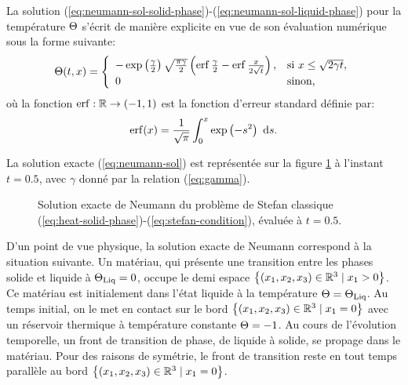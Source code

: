 La solution
(\ref{eq:neumann-sol-solid-phase})-(\ref{eq:neumann-sol-liquid-phase})
pour la température $\Theta$ s'écrit de manière explicite
en vue de son évaluation numérique sous la forme suivante:
\begin{equation}\label{eq:neumann-sol}
  \temperature(t, x) = \left\{
  \begin{array}{ll}
    -\exp\parent{\frac{\gamma}{2}}\sqrt{\frac{\pi\gamma}{2}} %
    \parent{\erf{\frac{\gamma}{2}} - \erf{\frac{x}{2\sqrt{t}}}}, %
    & \text{si } x \leq \sqrt{2\gamma t},\\
    0 %
    & \text{sinon,}
  \end{array}
  \right.
\end{equation}
où la fonction $\operatorname{erf}:\mathbb R\to(-1,1)$ est la fonction d'erreur
standard définie par:
\begin{equation}
  \operatorname{erf}(x) = \frac{1}{\sqrt \pi}\int_0^x \exp\left( -s^2 \right)\,\,\mathrm ds.
\end{equation}

La solution exacte (\ref{eq:neumann-sol}) est représentée sur la
figure \ref{fig:neumann-sol} à l'instant $t = 0.5$, avec $\gamma$
donné par la relation (\ref{eq:gamma}).

\begin{figure}
  \begin{center}
    
    \caption{Solution exacte de Neumann du problème de Stefan classique
      (\ref{eq:heat-solid-phase})-(\ref{eq:stefan-condition}), évaluée
      à $t = 0.5$.}
    \label{fig:neumann-sol}
  \end{center}
\end{figure}

D'un point de vue physique, la solution exacte de Neumann correspond à
la situation suivante. Un matériau, qui présente une transition entre
les phases solide et liquide à $\Theta_\text{Liq} = 0$, occupe le demi espace
$\left\{ (x_1, x_2, x_3)\in \mathbb R^3 \mid x_1 > 0 \right\}$. Ce matériau
est initialement dans l'état liquide à la température $\Theta =
\Theta_\text{Liq}$. Au temps initial, on le met en contact sur le bord
$\left\{ (x_1, x_2, x_3)\in\mathbb R^3 \mid x_1 = 0 \right\}$ avec un
réservoir thermique à température constante $\Theta = -1$. Au
cours de l'évolution temporelle, un front de transition de phase, de
liquide à solide, se propage dans le matériau. Pour des raisons de
symétrie, le front de transition reste en tout temps parallèle au
bord $\left\{ (x_1, x_2, x_3)\in\mathbb R^3 \mid x_1 = 0 \right\}$.

